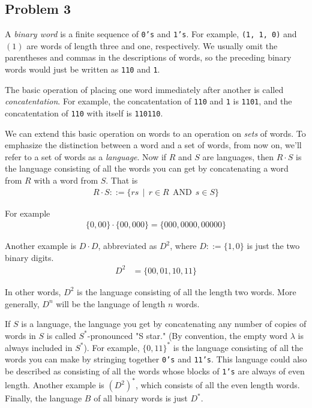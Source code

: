 \documentclass[12pt]{article}
\begin{document}
\subsection*{Problem 3}
\par{A \emph{binary word} is a finite sequence of \texttt{0's} and \texttt{1's}. For example, \texttt{(1, 1, 0)} and $(1)$ are words of length three and one, respectively. We usually omit the parentheses and commas in the descriptions of words, so the preceding binary words would just be written as \texttt{110} and \texttt{1}.}
\par{The basic operation of placing one word immediately after another is called \emph{concatentation}. For example, the concatentation of \texttt{110} and \texttt{1} is \texttt{1101}, and the concatentation of \texttt{110} with itself is \texttt{110110}.}
\par{We can extend this basic operation on words to an operation on \emph{sets} of words. To emphasize the distinction between a word and a set of words, from now on, we'll refer to a set of words as a \emph{language}. Now if $R$ and $S$ are languages, then $R \cdot S$ is the language consisting of all the words you can get by concatenating a word from $R$ with a word from $S$. That is}
\begin{align*}
R \cdot S ::= \{rs\:\:|\:\:r \in R\:\:\text{AND}\:\:s \in S\}
\end{align*}
\par{For example}
\begin{align*}
\{0, 00\} \cdot \{00, 000\} = \{000, 0000, 00000\}
\end{align*}
\par{Another example is $D \cdot D$, abbreviated as $D^2$, where $D ::= \{1, 0\}$ is just the two binary digits.}
\begin{align*}
D^2 &= \{00, 01, 10, 11\}
\end{align*}
\par{In other words, $D^2$ is the language consisting of all the length two words. More generally, $D^n$ will be the language of length $n$ words.}
\par{If $S$ is a language, the language you get by concatenating any number of copies of words in $S$ is called $S^*$-pronounced "S star." (By convention, the empty word $\lambda$ is always included in $S^*$). For example, $\{0,11\}^*$ is the language consisting of all the words you can make by stringing together \texttt{0's} and \texttt{11's}. This language could also be described as consisting of all the words whose blocks of \texttt{1's} are always of even length. Another example is $(D^2)^*$, which consists of all the even length words. Finally, the language $B$ of all binary words is just $D^*$.}
\end{document}
